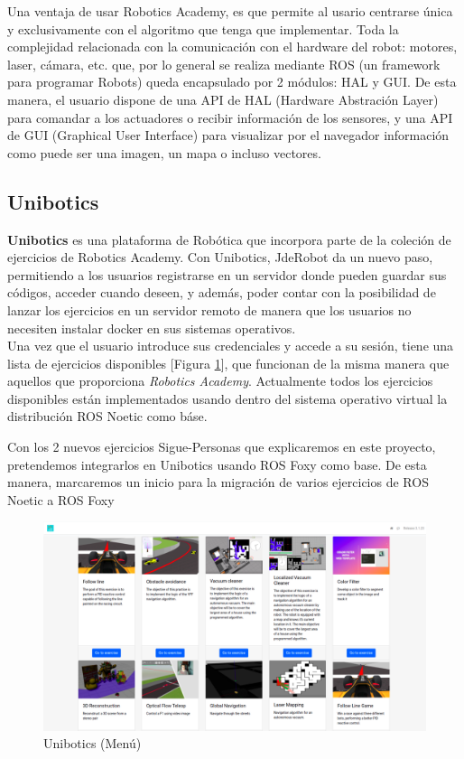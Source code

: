Una ventaja de usar Robotics Academy, es que permite al usario centrarse única y exclusivamente con el algoritmo que tenga que implementar. Toda la complejidad relacionada con la comunicación con el hardware del robot: motores, laser, cámara, etc. que, por lo general se realiza mediante ROS (un framework para programar Robots) queda encapsulado por 2 módulos: HAL y GUI. De esta manera, el usuario dispone de una API de HAL (Hardware Abstración Layer) para comandar a los actuadores o recibir información de los sensores, y una API de GUI (Graphical User Interface) para visualizar por el navegador información como puede ser una imagen, un mapa o incluso vectores.\\

\subsection{Unibotics}
\label{sec:unibotics}

\textbf{Unibotics} es una plataforma de Robótica que incorpora parte de la coleción de ejercicios de Robotics Academy. Con Unibotics, JdeRobot da un nuevo paso, permitiendo a los usuarios registrarse en un servidor donde pueden guardar sus códigos, acceder cuando deseen, y además, poder contar con la posibilidad de lanzar los ejercicios en un servidor remoto de manera que los usuarios no necesiten instalar docker en sus sistemas operativos.\\

Una vez que el usuario introduce sus credenciales y accede a su sesión, tiene una lista de ejercicios disponibles [Figura \ref{fig:menu-unibotics}], que funcionan de la misma manera que aquellos que proporciona \textit{Robotics Academy}. Actualmente todos los ejercicios disponibles están implementados usando dentro del sistema operativo virtual la distribución ROS Noetic como báse.

Con los 2 nuevos ejercicios Sigue-Personas que explicaremos en este proyecto, pretendemos integrarlos en Unibotics usando ROS Foxy como base. De esta manera, marcaremos un inicio para la migración de varios ejercicios de ROS Noetic a ROS Foxy

\begin{figure} [h!]
  \begin{center}
    \includegraphics[width=15cm]{imagenes/unibotics-menu.png}
  \end{center}
  \caption[Unibotics (Menú)]{Unibotics (Menú)}
  \label{fig:menu-unibotics}
\end{figure}





